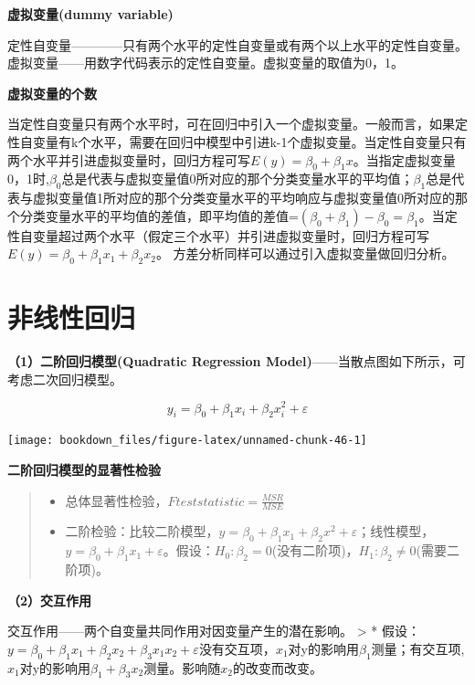 \documentclass[]{ctexbook}
\providecommand{\tightlist}{%
  \setlength{\itemsep}{0pt}\setlength{\parskip}{0pt}}
\begin{document}
\textbf{虚拟变量(dummy variable)}

定性自变量------------只有两个水平的定性自变量或有两个以上水平的定性自变量。虚拟变量------用数字代码表示的定性自变量。虚拟变量的取值为0，1。

\textbf{虚拟变量的个数}

当定性自变量只有两个水平时，可在回归中引入一个虚拟变量。一般而言，如果定性自变量有k个水平，需要在回归中模型中引进k-1个虚拟变量。当定性自变量只有两个水平并引进虚拟变量时，回归方程可写\(E(y)=\beta_0+\beta_1x\)。当指定虚拟变量0，1时,\(\beta_0\)总是代表与虚拟变量值0所对应的那个分类变量水平的平均值；\(\beta_1\)总是代表与虚拟变量值1所对应的那个分类变量水平的平均响应与虚拟变量值0所对应的那个分类变量水平的平均值的差值，即平均值的差值=\((\beta_0+\beta_1)-\beta_0=\beta_1\)。当定性自变量超过两个水平（假定三个水平）并引进虚拟变量时，回归方程可写\(E(y)=\beta_0+ \beta_1x_1+\beta_2x_2\)。
方差分析同样可以通过引入虚拟变量做回归分析。

\hypertarget{ux975eux7ebfux6027ux56deux5f52}{%
\section{非线性回归}\label{ux975eux7ebfux6027ux56deux5f52}}

\textbf{（1）二阶回归模型(Quadratic Regression Model)}------当散点图如下所示，可考虑二次回归模型。

\[y_i=\beta_0+\beta_1x_i+\beta_2x_i^2+\varepsilon\]

\texttt{[image: bookdown\_files/figure-latex/unnamed-chunk-46-1]}

\textbf{二阶回归模型的显著性检验}

\begin{quote}
\begin{itemize}
\tightlist
\item
  总体显著性检验，\(F test statistic=\frac{MSR}{MSE}\)
\item
  二阶检验：比较二阶模型，\(y=\beta_0+\beta_1x_1+\beta_2x^2+\varepsilon\)；线性模型，\(y=\beta_0+\beta_1x_1+\varepsilon\)。假设：\(H_0:\beta_2=0\)(没有二阶项)，\(H_1:\beta_2\neq 0\)(需要二阶项)。
\end{itemize}
\end{quote}

\textbf{（2）交互作用}

交互作用------两个自变量共同作用对因变量产生的潜在影响。
\textgreater{} * 假设：\(y=\beta_0+\beta_1x_1+\beta_2x_2+\beta_3x_1x_2+\varepsilon\)没有交互项，\(x_1\)对y的影响用\(\beta_1\)测量；有交互项,\(x_1\)对y的影响用\(\beta_1+\beta_3x_2\)测量。影响随\(x_2\)的改变而改变。
\end{document}
